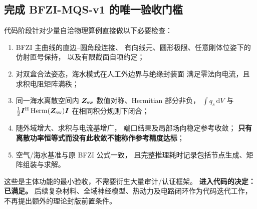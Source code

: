 \subsection{完成 BFZI-MQS-v1 的唯一验收门槛}
代码阶段针对少量自洽物理算例直接做以下必要检查：
\begin{enumerate}
\item BFZI 主曲线的直边--圆角段连接、
有向线元、圆形极限、任意刚体位姿下的仿射匝号保持，
以及有限截面自项约定；
\item 对双盒合法姿态，海水模式在人工外边界与绝缘封装面
满足零法向电流，且求积电阻矩阵满秩；
\item 同一海水离散空间内
\(\bm Z_{\rm sw}\) 数值对称、Hermitian 部分非负，
\(\int q_s\,\mathrm dV\) 与
\(\tfrac12\bm I^{\mathrm H}\operatorname{Herm}(\bm Z_{\rm sw})\bm I\)
在相同积分规则下闭合；
\item 随外域增大、求积与电流基增广，
端口结果及局部场向稳定参考收敛；
\textbf{只有离散功率恒等式而没有此收敛不能称作参考精度达标}；
\item 空气/海水基准与原 BFZI 公式一致，
且完整推理耗时记录包括节点生成、矩阵组装与求解。
\end{enumerate}
这些是主体功能的最小验收，不需要衍生大量审计/认证框架。
\textbf{进入代码的决定：已满足。}
后续复杂材料、全域神经模型、热动力及电路闭环作为代码迭代工作，
不再提出额外的理论封版前置条件。
